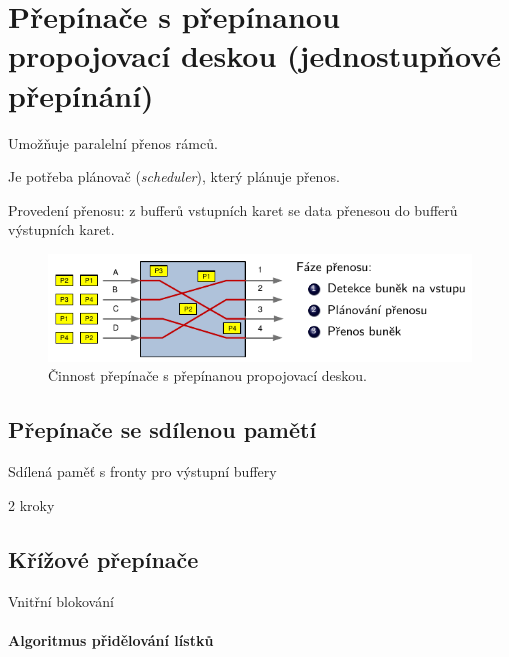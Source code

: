 
\section{Přepínače s přepínanou propojovací deskou (jednostupňové přepínání)}

\begin{compactitem}
    \item Umožňuje paralelní přenos rámců.
    \item Je potřeba plánovač (\textit{scheduler}), který plánuje přenos.
    \item Provedení přenosu: z bufferů vstupních karet se data přenesou do bufferů výstupních karet.
\end{compactitem}

\begin{figure}[H]
    \centering
    \includegraphics[width=1\linewidth]{prepinana_propojovaci_deska.pdf}
    \caption{Činnost přepínače s přepínanou propojovací deskou.}
\end{figure}

\subsection{Přepínače se sdílenou pamětí}

Sdílená paměť s fronty pro výstupní buffery

2 kroky


\subsection{Křížové přepínače}

Vnitřní blokování


\paragraph*{Algoritmus přidělování lístků} 

